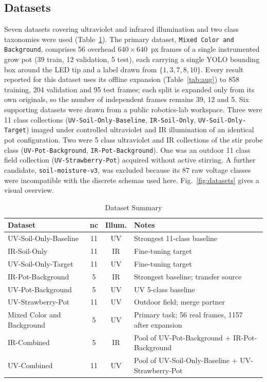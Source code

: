 ﻿\documentclass[journal]{IEEEtran}
\begin{document}
\subsection{Datasets}
Seven datasets covering ultraviolet and infrared illumination and two class taxonomies were used (Table~\ref{tab:datasets}). The primary dataset, \texttt{Mixed Color and Background}, comprises 56 overhead $640 \times 640$~px frames of a single instrumented grow pot (39 train, 12 validation, 5 test), each carrying a single YOLO bounding box around the LED tip and a label drawn from $\{1, 3, 7, 8, 10\}$. Every result reported for this dataset uses its offline expansion (Table~\ref{tab:aug}) to 858 training, 204 validation and 95 test frames; each split is expanded only from its own originals, so the number of independent frames remains 39, 12 and 5. Six supporting datasets were drawn from a public robotics-lab workspace. Three were 11 class collections (\texttt{UV-Soil-Only-Baseline}, \texttt{IR-Soil-Only}, \texttt{UV-Soil-Only-Target}) imaged under controlled ultraviolet and IR illumination of an identical pot configuration. Two were 5 class ultraviolet and IR collections of the stir probe class (\texttt{UV-Pot-Background}, \texttt{IR-Pot-Background}). One was an outdoor 11 class field collection (\texttt{UV-Strawberry-Pot}) acquired without active stirring. A further candidate, \texttt{soil-moisture-v3}, was excluded because its 87 raw voltage classes were incompatible with the discrete schemas used here. Fig.~\ref{fig:datasets} gives a visual overview.

\begin{table}[!t]
\renewcommand{\arraystretch}{1.3}
\caption{Dataset Summary}
\label{tab:datasets}
\centering
\footnotesize
\begin{tabular}{p{2.9cm} c c p{2.1cm}}
\toprule
\textbf{Dataset} & \textbf{nc} & \textbf{Illum.} & \textbf{Notes} \\
\midrule
UV-Soil-Only-Baseline & 11 & UV & Strongest 11-class baseline \\
IR-Soil-Only & 11 & IR & Fine-tuning target \\
UV-Soil-Only-Target & 11 & UV & Fine-tuning target \\
IR-Pot-Background & 5 & IR & Strongest baseline; transfer source \\
UV-Pot-Background & 5 & UV & UV 5-class baseline \\
UV-Strawberry-Pot & 11 & UV & Outdoor field; merge partner \\
Mixed Color and Background & 5 & UV & Primary task; 56 real frames, 1157 after expansion \\
IR-Combined & 5 & IR & Pool of UV-Pot-Background + IR-Pot-Background \\
UV-Combined & 11 & UV & Pool of UV-Soil-Only-Baseline + UV-Strawberry-Pot \\
\bottomrule
\end{tabular}
\end{table}
\end{document}
